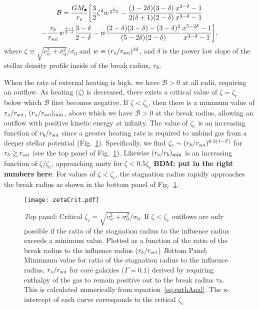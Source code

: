 \begin{multline}
  \mathcal{B} =\frac{G M_{\bullet}}{r_s} 
\biggl[
  \frac{3}{2} \zeta^2 w^{\frac{1}{3 -\delta}}
  -\frac{(1-2\delta)(3-\delta)}{2(\delta+1)(2-\delta)}  \frac{x^{2  -\delta}-1}{x^{3-\delta}-1}\\
  -\frac{r_b}{r_{\rm soi}} w^{\frac{\delta-1}{3-\delta}} \frac{3 -\delta}{2 -\delta} 
  -w \frac{(2-\delta)(3-\delta)-(3-\delta)^{2}}{(5-2\delta)(2-\delta)} \frac{x^{5-2\delta}-1}{x^{3-\delta}-1}
\biggr],
\label{eq:enthAnal}
\end{multline}
where $\zeta \equiv \sqrt{v_w^2+\sigma_0^2}/\sigma_0$ and $w\equiv (r_s/r_{\rm soi})^{3\delta}$, and
$\delta$ is the power law slope of the stellar density profile inside
of the break radius, $r_b$.

When the rate of external heating is high, we have $\mathcal{B} > 0$ at all radii, requiring an outflow.  As heating ($\zeta$) is decreased, there exists a critical value of $\zeta = \zeta_{c}$ below which $\mathcal{B}$ first becomes negative.  If $\zeta<\zeta_c$, then there is a minimum value of $r_s/r_{\rm soi}$, $(r_s/r_{\rm soi})_{\rm min}$, above which we have $\mathcal{B} > 0$ at the break radius, allowing an outflow with positive kinetic energy at infinity.  The value of $\zeta_c$ is an increasing function of $r_{b}/r_{\rm soi}$ since a greater heating rate is required to unbind gas from a deeper stellar potential (Fig.~\ref{fig:zetaCrit}).  Specifically, we find $\zeta_c\sim (r_b/r_{\rm soi})^{0.5(1-\Gamma)}$ for $\rb\gsim\rsoi$ (see the top panel of
Fig.~\ref{fig:zetaCrit}). Likewise $(r_{\rm s}/r_{b})_{\rm min}$ is an increasing function of $\zeta/\zeta_{c}$, approaching unity for $\zeta < 0.5\zeta_c$ {\bf BDM: put in the right numbers here}.  For values of $\zeta<\zeta_c$, the stagnation radius rapidly approaches the break radius as shown in the
bottom panel of Fig.~\ref{fig:zetaCrit}.

\begin{figure}
\texttt{[image: zetaCrit.pdf]}
\caption{\label{fig:zetaCrit} {\emph Top panel:} Critical
  $\zeta_c=\sqrt{v_w^2+\sigma_0^2}/\sigma_0$. If $\zeta<\zeta_c$ outflows are
  only possible if the ratio of the stagnation radius to the influence
  radius exceeds a minimum value. Plotted as a function of the ratio
  of the break radius to the influence radius ($r_b/r_{\rm soi}$) {\emph Bottom
    Panel:} Mininmum value for ratio of the stagnation radius to the
  influence radius, $r_s/r_{\rm soi}$ for core galaxies ($\Gamma=0.1$)
  derived by requiring enthalpy of the gas to remain positive out to
  the break radius $r_b$. This is calculated numerically from
  equation~\eqref{eq:enthAnal}. The x-intercept of each curve
  corresponds to the critical $\zeta_c$}
\end{figure}



